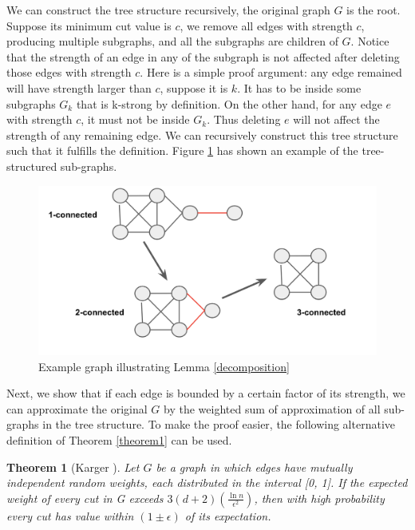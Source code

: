 \documentclass{article}
\newtheorem{theorem}{Theorem}
\begin{document}
We can construct the tree structure recursively, the original graph $G$ is the root. Suppose its minimum cut value is $c$, we remove all edges with strength $c$, producing multiple subgraphs, and all the subgraphs are children of $G$. Notice that the strength of an edge in any of the subgraph is not affected after deleting those edges with strength $c$. Here is a simple proof argument: any edge remained will have strength larger than $c$, suppose it is $k$. It has to be inside some subgraphs $G_k$ that is k-strong by definition. On the other hand, for any edge $e$ with strength $c$, it must not be inside $G_k$. Thus deleting $e$ will not affect the strength of any remaining edge. We can recursively construct this tree structure such that it fulfills the definition. Figure \ref{fig:decomposition} has shown an example of the tree-structured sub-graphs. 


\begin{figure}[h!]
\centering
\includegraphics[scale=0.4]{images/decomposition.png}
\caption{Example graph illustrating Lemma \ref{decomposition}}
\label{fig:decomposition}
\end{figure}

\bigskip

Next, we show that if each edge is bounded by a certain factor of its strength, we can approximate the original $G$ by the weighted sum of approximation of all sub-graphs in the tree structure. To make the proof easier, the following alternative definition of Theorem \ref{theorem1} can be used. 

\begin{theorem}[Karger \cite{benczur2015randomized}] \label{theorem2}
Let $G$ be a graph in which edges have mutually independent random weights, each distributed in the interval [0, 1]. If the expected weight of every cut in G exceeds $3(d+2)(\frac{\ln{n}}{\epsilon^2})$, then with high probability every cut has value within $(1\pm\epsilon)$ of its expectation. 
\end{theorem}
\end{document}
